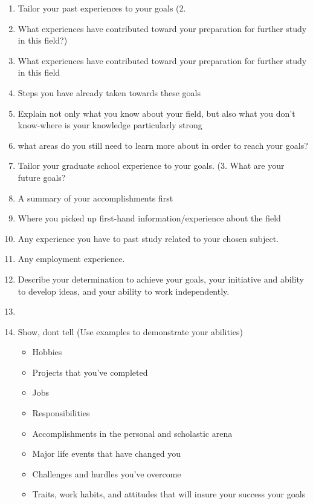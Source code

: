 \documentclass[a4paper,12pt]{article}%
\begin{document}
  \begin{enumerate}
	\item  Tailor your past experiences to your goals  (2.	
	\item What experiences have contributed toward your preparation for further study in this field?)  
\item What experiences have contributed toward your preparation for further study in this field
			\item Steps you have already taken towards these goals   
\item	Explain not only what you know about your field, but also what you don't know-where is your knowledge particularly strong 
\item what areas do you still need to learn more about in order to reach your goals?


	  \hrulefill
	  
	  \hrulefill
	  
	\item  Tailor your graduate school experience to your goals. (3.	What are your future goals?  		\item	A summary of your accomplishments first
					\item		Where you picked up first-hand information/experience about the field
	\item 		 	Any experience you have to past study related to your chosen subject.
	\item 		 	Any employment experience.
	\item Describe your determination to achieve your goals, your initiative and ability to develop ideas, and your ability to work independently.
		 
		  \item  \hrulefill
		  
	  \hrulefill
	  
	\item Show, dont tell (Use examples to demonstrate your abilities)
\begin{itemize}
	\item Hobbies 
	\item Projects that you've completed
	\item Jobs
	\item Responsibilities
	\item Accomplishments in the personal and scholastic arena
	\item Major life events that have changed you
	\item Challenges and hurdles you've overcome
 	\item Traits, work habits, and attitudes that will insure your success your goals
\end{itemize}
	  \hrulefill
	  

\end{enumerate}
\end{document}
